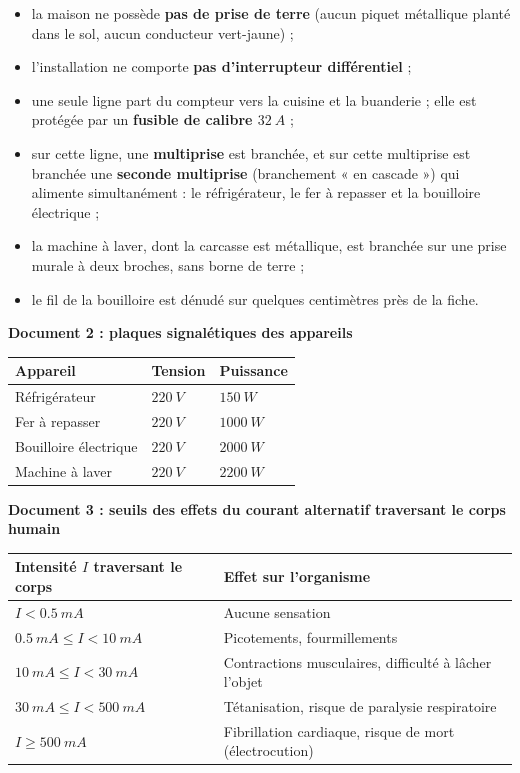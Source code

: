 \documentclass[11pt]{article}
\begin{document}
\begin{itemize}
\item la maison ne possède \textbf{pas de prise de terre} (aucun piquet métallique planté dans le sol, aucun conducteur vert-jaune) ;
\item l'installation ne comporte \textbf{pas d'interrupteur différentiel} ;
\item une seule ligne part du compteur vers la cuisine et la buanderie ; elle est protégée par un \textbf{fusible de calibre $\SI{32}{A}$} ;
\item sur cette ligne, une \textbf{multiprise} est branchée, et sur cette multiprise est branchée une \textbf{seconde multiprise} (branchement « en cascade ») qui alimente simultanément : le réfrigérateur, le fer à repasser et la bouilloire électrique ;
\item la machine à laver, dont la carcasse est métallique, est branchée sur une prise murale à deux broches, sans borne de terre ;
\item le fil de la bouilloire est dénudé sur quelques centimètres près de la fiche.
\end{itemize}

\textbf{Document 2 : plaques signalétiques des appareils}

\begin{center}
\begin{tabularx}{\linewidth}{|l|X|X|}
\hline
\rowcolor{popblueL} \textbf{Appareil} & \textbf{Tension} & \textbf{Puissance} \\
\hline
Réfrigérateur & $\SI{220}{V}$ & $\SI{150}{W}$ \\
\hline
Fer à repasser & $\SI{220}{V}$ & $\SI{1000}{W}$ \\
\hline
Bouilloire électrique & $\SI{220}{V}$ & $\SI{2000}{W}$ \\
\hline
Machine à laver & $\SI{220}{V}$ & $\SI{2200}{W}$ \\
\hline
\end{tabularx}
\end{center}

\textbf{Document 3 : seuils des effets du courant alternatif traversant le corps humain}

\begin{center}
\begin{tabularx}{\linewidth}{|l|X|}
\hline
\rowcolor{popblueL} \textbf{Intensité $I$ traversant le corps} & \textbf{Effet sur l'organisme} \\
\hline
$I < \SI{0,5}{mA}$ & Aucune sensation \\
\hline
$\SI{0,5}{mA} \leq I < \SI{10}{mA}$ & Picotements, fourmillements \\
\hline
$\SI{10}{mA} \leq I < \SI{30}{mA}$ & Contractions musculaires, difficulté à lâcher l'objet \\
\hline
$\SI{30}{mA} \leq I < \SI{500}{mA}$ & Tétanisation, risque de paralysie respiratoire \\
\hline
$I \geq \SI{500}{mA}$ & Fibrillation cardiaque, risque de mort (électrocution) \\
\hline
\end{tabularx}
\end{center}
\end{document}
